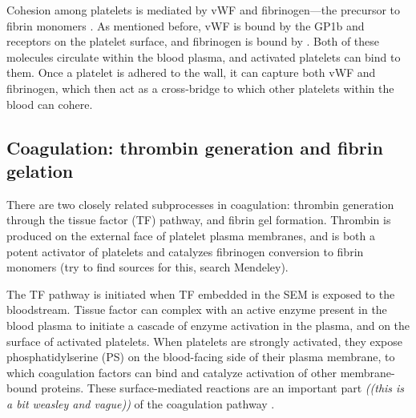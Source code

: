 Cohesion among platelets is mediated by vWF and fibrinogen---the
precursor to fibrin monomers \cite{Fogelson2015}. As mentioned before,
vWF is bound by the GP1b and  receptors on the
platelet surface, and fibrinogen is bound by . Both of
these molecules circulate within the blood plasma, and activated
platelets can bind to them. Once a platelet is adhered to the wall, it
can capture both vWF and fibrinogen, which then act as a cross-bridge
to which other platelets within the blood can cohere.

\subsection{Coagulation: thrombin generation and fibrin gelation}
\label{sec:coagulation}

There are two closely related subprocesses in coagulation: thrombin
generation through the tissue factor (TF) pathway, and fibrin gel
formation. Thrombin is produced on the external face of platelet
plasma membranes, and is both a potent activator of platelets
\cite{Heemskerk2002,Heemskerk2013} and catalyzes fibrinogen conversion
to fibrin monomers (try to find sources for this, search Mendeley).


The TF pathway is initiated when TF embedded in the SEM is exposed to
the bloodstream. Tissue factor can complex with an active enzyme
present in the blood plasma to initiate a cascade of enzyme activation
in the plasma, and on the surface of activated platelets. When
platelets are strongly activated, they expose phosphatidylserine (PS)
on the blood-facing side of their plasma membrane, to which
coagulation factors can bind and catalyze activation of other
membrane-bound proteins. These surface-mediated reactions are an
important part \emph{((this is a bit weasley and vague))} of the coagulation
pathway \cite{Fogelson1998,Kuharsky2001}.
	


